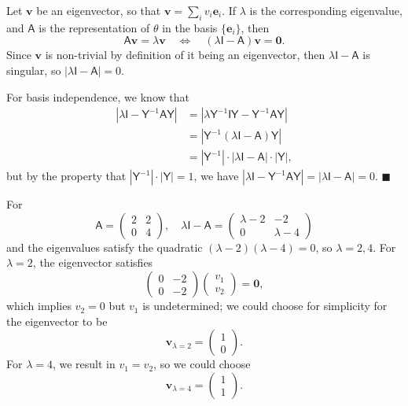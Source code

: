 \documentclass[letter-paper]{tufte-book}
\newenvironment{proof}[1][Proof]{\begin{trivlist}
\item[\hskip \labelsep {\bfseries #1}]}{\end{trivlist}}
\newenvironment{example}[1][Example]{\begin{trivlist}
\item[\hskip \labelsep {\bfseries #1}]}{\end{trivlist}}
\newcommand{\As}{{\mathsf{A}}}
\newcommand{\Is}{{\mathsf{I}}}
\newcommand{\Ys}{{\mathsf{Y}}}
\newcommand{\Ob}{{\boldsymbol{0}}}
\newcommand{\eb}{{\boldsymbol{e}}}
\newcommand{\vb}{{\boldsymbol{v}}}
\newcommand{\qed}{\hfill$\blacksquare$}
\begin{document}
\begin{proof}
  Let $\vb$ be an eigenvector, so that $\vb=\sum_i v_i\eb_i$. If $\lambda$ is the corresponding eigenvalue, and $\textsf{A}$ is the representation of $\theta$ in the basis $\{\eb_i\}$, then
  \begin{equation*}
    \As\vb = \lambda\vb \quad \Leftrightarrow \quad (\lambda\Is - \As)\vb = \Ob.
  \end{equation*}
  Since $\vb$ is non-trivial by definition of it being an eigenvector, then $\lambda\Is - \As$ is singular, so $|\lambda\Is - \As| = 0$.
  
  For basis independence, we know that
  \begin{align*}
    |\lambda\Is - \Ys^{-1}\As\Ys| &= |\lambda\Ys^{-1}\Is\Ys - \Ys^{-1}\As\Ys| \\
      & = |\Ys^{-1}(\lambda\Is- \As)\Ys|\\
      & = |\Ys^{-1}| \cdot |\lambda\Is- \As| \cdot |\Ys|,
  \end{align*}
  but by the property that $|\Ys^{-1}| \cdot |\Ys| = 1$, we have $|\lambda\Is - \Ys^{-1}\As\Ys| = |\lambda\Is- \As| = 0$. \qed
\end{proof}

\begin{example}
  For
  \begin{equation*}
    \As = \begin{pmatrix}2 & 2 \\ 0 & 4\end{pmatrix}, \quad \lambda\Is - \As = \begin{pmatrix}\lambda - 2 & -2 \\ 0 & \lambda - 4\end{pmatrix}
  \end{equation*}
  and the eigenvalues satisfy the quadratic $(\lambda-2)(\lambda-4) = 0$, so $\lambda=2, 4$. For $\lambda=2$, the eigenvector satisfies
  \begin{equation*}
    \begin{pmatrix}0 & -2 \\ 0 & -2\end{pmatrix}\begin{pmatrix}v_1 \\ v_2 \end{pmatrix} = \Ob,
  \end{equation*}
  which implies $v_2 = 0$ but $v_1$ is undetermined; we could choose for simplicity for the eigenvector to be
  \begin{equation*}
    \vb_{\lambda=2} = \begin{pmatrix}1 \\ 0 \end{pmatrix}.
  \end{equation*}
  For $\lambda = 4$, we result in $v_1 = v_2$, so we could choose
  \begin{equation*}
    \vb_{\lambda=4} = \begin{pmatrix}1 \\ 1 \end{pmatrix}.
  \end{equation*}
\end{example}
\end{document}
